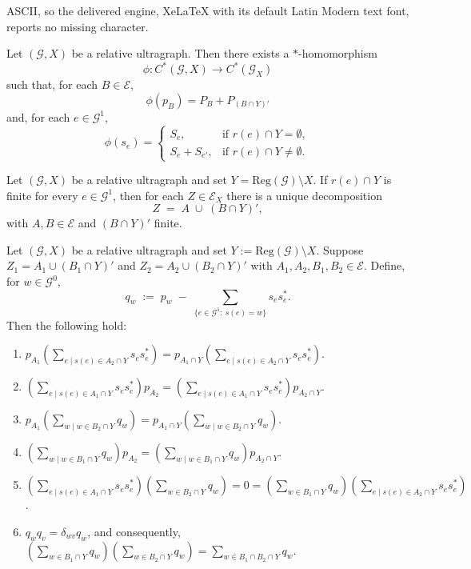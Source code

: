 \documentclass[10pt,a4paper]{amsart}
\begin{document}
ASCII, so the delivered engine, XeLaTeX with its default Latin Modern text font, reports no missing character.
\begin{proposition}
    \label{esfriou, vai dar tainha}
Let $(\mathcal{G}, X)$ be a relative ultragraph. Then there exists a 
$*$-homomorphism 
\[
\phi: C^*(\mathcal{G},X) \longrightarrow C^*(\mathcal{G}_X)
\]
such that, for each $B \in \mathcal{E}$,
\[
\phi(p_B) = P_B + P_{(B \cap Y)'}
\]
and, for each $e \in \mathcal{G}^1$,
\[
\phi(s_e) =
\begin{cases}
    S_e, & \text{if } r(e) \cap Y = \emptyset, \\[6pt]
    S_e + S_{e'}, & \text{if } r(e) \cap Y \neq \emptyset.
\end{cases}
\]
\end{proposition}

\begin{corollary}\label{decomposition2}
Let $(\mathcal{G},X)$ be a relative ultragraph and set $Y=\mathrm{Reg}(\mathcal{G})\setminus X$.
If $r(e)\cap Y$ is finite for every $e\in\mathcal{G}^1$, then for each $Z\in\mathcal{E}_X$ there
is a unique decomposition
\[
Z \;=\; A \;\cup\; (B\cap Y)',
\]
with $A,B\in\mathcal{E}$ and $(B\cap Y)'$ finite.
\end{corollary}

\begin{lemma}\label{contas1}
Let $(\mathcal{G},X)$ be a relative ultragraph and set $Y:=\mathrm{Reg}(\mathcal{G})\setminus X$.
Suppose $Z_1=A_1\cup (B_1\cap Y)'$ and $Z_2=A_2\cup (B_2\cap Y)'$ with $A_1,A_2,B_1,B_2\in\mathcal{E}$.
Define, for $w\in \mathcal{G}^0$,
\[
q_w \;:=\; p_w \;-\; \sum_{\{e\in \mathcal{G}^1:\ s(e)=w\}} s_e s_e^* .
\]
Then the following hold:
\begin{enumerate}
    \item \(p_{A_1} \left( \sum\limits_{e \mid s(e) \in A_2 \cap Y} s_e s_e^* \right) = p_{A_1 \cap Y} \left( \sum\limits_{e \mid s(e) \in A_2 \cap Y} s_e s_e^* \right)\).
    \item \(\left( \sum\limits_{e \mid s(e) \in A_1 \cap Y} s_e s_e^* \right) p_{A_2} = \left( \sum\limits_{e \mid s(e) \in A_1 \cap Y} s_e s_e^* \right) p_{A_2 \cap Y}\).
    \item \(p_{A_1} \left( \sum\limits_{w \mid w \in B_2 \cap Y} q_w \right) = p_{A_1 \cap Y} \left( \sum\limits_{w \mid w \in B_2 \cap Y} q_w \right)\).
    \item \(\left( \sum\limits_{w \mid w \in B_1 \cap Y} q_w \right) p_{A_2} = \left( \sum\limits_{w \mid w \in B_1 \cap Y} q_w \right) p_{A_2 \cap Y}\).
    \item \(\left( \sum\limits_{e \mid s(e) \in A_1 \cap Y} s_e s_e^* \right) \left( \sum\limits_{w \in B_2 \cap Y} q_w \right) = 0 = \left( \sum\limits_{w \in B_1 \cap Y} q_w \right) \left( \sum\limits_{e \mid s(e) \in A_2 \cap Y} s_e s_e^* \right)\).
    \item \(q_w q_v = \delta_{wv} q_w\), and consequently, \(\left( \sum\limits_{w \in B_1 \cap Y} q_w \right) \left( \sum\limits_{w \in B_2 \cap Y} q_w \right) = \sum\limits_{w \in B_1 \cap B_2 \cap Y} q_w\).
\end{enumerate}
\end{lemma}
\end{document}
